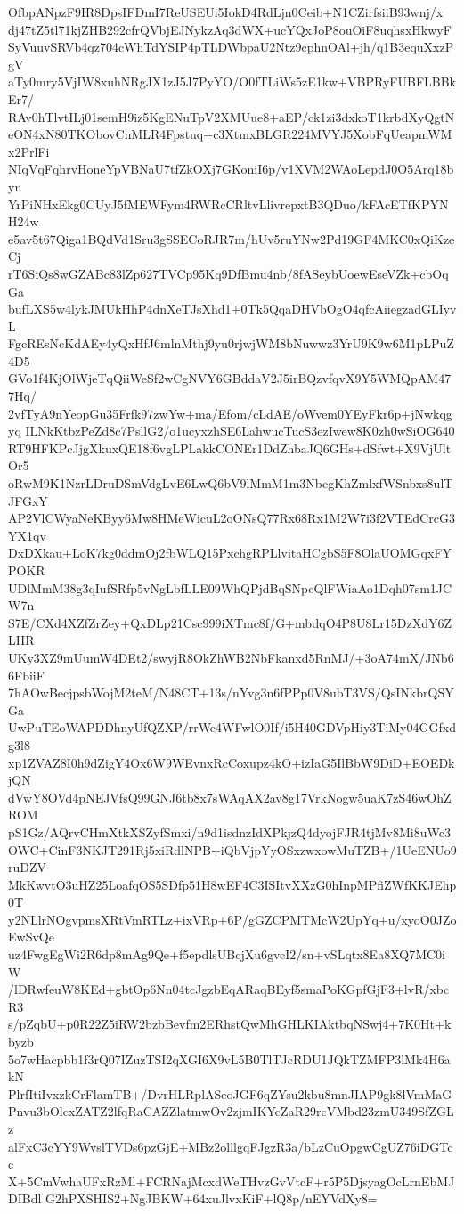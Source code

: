 OfbpANpzF9IR8DpsIFDmI7ReUSEUi5IokD4RdLjn0Ceib+N1CZirfsiiB93wnj/x
dj47tZ5tl71kjZHB292cfrQVbjEJNykzAq3dWX+ucYQxJoP8ouOiF8uqhsxHkwyF
SyVuuvSRVb4qz704cWhTdYSIP4pTLDWbpaU2Ntz9cphnOAl+jh/q1B3equXxzPgV
aTy0mry5VjIW8xuhNRgJX1zJ5J7PyYO/O0fTLiWs5zE1kw+VBPRyFUBFLBBkEr7/
RAv0hTlvtILj01semH9iz5KgENuTpV2XMUue8+aEP/ck1zi3dxkoT1krbdXyQgtN
eON4xN80TKObovCnMLR4Fpstuq+c3XtmxBLGR224MVYJ5XobFqUeapmWMx2PrlFi
NIqVqFqhrvHoneYpVBNaU7tfZkOXj7GKoniI6p/v1XVM2WAoLepdJ0O5Arq18byn
YrPiNHxEkg0CUyJ5fMEWFym4RWRcCRltvLlivrepxtB3QDuo/kFAcETfKPYNH24w
e5av5t67Qiga1BQdVd1Sru3gSSECoRJR7m/hUv5ruYNw2Pd19GF4MKC0xQiKzeCj
rT6SiQs8wGZABc83lZp627TVCp95Kq9DfBmu4nb/8fASeybUoewEseVZk+cbOqGa
bufLXS5w4lykJMUkHhP4dnXeTJsXhd1+0Tk5QqaDHVbOgO4qfcAiiegzadGLIyvL
FgcREsNcKdAEy4yQxHfJ6mlnMthj9yu0rjwjWM8bNuwwz3YrU9K9w6M1pLPuZ4D5
GVo1f4KjOlWjeTqQiiWeSf2wCgNVY6GBddaV2J5irBQzvfqvX9Y5WMQpAM477Hq/
2vfTyA9nYeopGu35Frfk97zwYw+ma/Efom/cLdAE/oWvem0YEyFkr6p+jNwkqgyq
ILNkKtbzPeZd8c7PsllG2/o1ucyxzhSE6LahwucTucS3ezIwew8K0zh0wSiOG640
RT9HFKPcJjgXkuxQE18f6vgLPLakkCONEr1DdZhbaJQ6GHs+dSfwt+X9VjUltOr5
oRwM9K1NzrLDruDSmVdgLvE6LwQ6bV9lMmM1m3NbcgKhZmlxfWSnbxs8ulTJFGxY
AP2VlCWyaNeKByy6Mw8HMeWicuL2oONsQ77Rx68Rx1M2W7i3f2VTEdCrcG3YX1qv
DxDXkau+LoK7kg0ddmOj2fbWLQ15PxchgRPLlvitaHCgbS5F8OlaUOMGqxFYPOKR
UDlMmM38g3qIufSRfp5vNgLbfLLE09WhQPjdBqSNpcQlFWiaAo1Dqh07sm1JCW7n
S7E/CXd4XZfZrZey+QxDLp21Csc999iXTmc8f/G+mbdqO4P8U8Lr15DzXdY6ZLHR
UKy3XZ9mUumW4DEt2/swyjR8OkZhWB2NbFkanxd5RnMJ/+3oA74mX/JNb66FbiiF
7hAOwBecjpsbWojM2teM/N48CT+13s/nYvg3n6fPPp0V8ubT3VS/QsINkbrQSYGa
UwPuTEoWAPDDhnyUfQZXP/rrWc4WFwlO0If/i5H40GDVpHiy3TiMy04GGfxdg3l8
xp1ZVAZ8I0h9dZigY4Ox6W9WEvnxRcCoxupz4kO+izIaG5IlBbW9DiD+EOEDkjQN
dVwY8OVd4pNEJVfsQ99GNJ6tb8x7sWAqAX2av8g17VrkNogw5uaK7zS46wOhZROM
pS1Gz/AQrvCHmXtkXSZyfSmxi/n9d1isdnzIdXPkjzQ4dyojFJR4tjMv8Mi8uWc3
OWC+CinF3NKJT291Rj5xiRdlNPB+iQbVjpYyOSxzwxowMuTZB+/1UeENUo9ruDZV
MkKwvtO3uHZ25LoafqOS5SDfp51H8wEF4C3ISItvXXzG0hInpMPfiZWfKKJEhp0T
y2NLlrNOgvpmsXRtVmRTLz+ixVRp+6P/gGZCPMTMcW2UpYq+u/xyoO0JZoEwSvQe
uz4FwgEgWi2R6dp8mAg9Qe+f5epdlsUBcjXu6gvcI2/sn+vSLqtx8Ea8XQ7MC0iW
/lDRwfeuW8KEd+gbtOp6Nn04tcJgzbEqARaqBEyf5smaPoKGpfGjF3+lvR/xbcR3
s/pZqbU+p0R22Z5iRW2bzbBevfm2ERhstQwMhGHLKIAktbqNSwj4+7K0Ht+kbyzb
5o7wHacpbb1f3rQ07IZuzTSI2qXGI6X9vL5B0TlTJcRDU1JQkTZMFP3lMk4H6akN
PlrfItiIvxzkCrFlamTB+/DvrHLRplASeoJGF6qZYsu2kbu8mnJIAP9gk8lVmMaG
Pnvu3bOlcxZATZ2lfqRaCAZZlatmwOv2zjmIKYcZaR29rcVMbd23zmU349SfZGLz
alFxC3cYY9WvslTVDs6pzGjE+MBz2olllgqFJgzR3a/bLzCuOpgwCgUZ76iDGTcc
X+5CmVwhaUFxRzMl+FCRNajMcxdWeTHvzGvVtcF+r5P5DjsyagOcLrnEbMJDIBdl
G2hPXSHIS2+NgJBKW+64xuJlvxKiF+lQ8p/nEYVdXy8=
